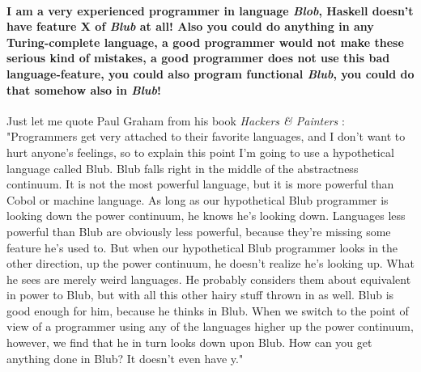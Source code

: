 \paragraph{I am a very experienced programmer in language \textit{Blob}, Haskell doesn't have feature X of \textit{Blub} at all! Also you could do anything in any Turing-complete language, a good programmer would not make these serious kind of mistakes, a good programmer does not use this bad language-feature, you could also program functional \textit{Blub}, you could do that somehow also in \textit{Blub}!}
Just let me quote Paul Graham from his book \textit{Hackers \& Painters} \cite{graham_hackers_2004}: 
"Programmers get very attached to their favorite languages, and I don't want to hurt anyone's feelings, so to explain this point I'm going to use a hypothetical language called Blub. Blub falls right in the middle of the abstractness continuum. It is not the most powerful language, but it is more powerful than Cobol or machine language. As long as our hypothetical Blub programmer is looking down the power continuum, he knows he's looking down. Languages less powerful than Blub are obviously less powerful, because they're missing some feature he's used to. But when our hypothetical Blub programmer looks in the other direction, up the power continuum, he doesn't realize he's looking up. What he sees are merely weird languages. He probably considers them about equivalent in power to Blub, but with all this other hairy stuff thrown in as well. Blub is good enough for him, because he thinks in Blub. When we switch to the point of view of a programmer using any of the languages higher up the power continuum, however, we find that he in turn looks down upon Blub. How can you get anything done in Blub? It doesn't even have y."

